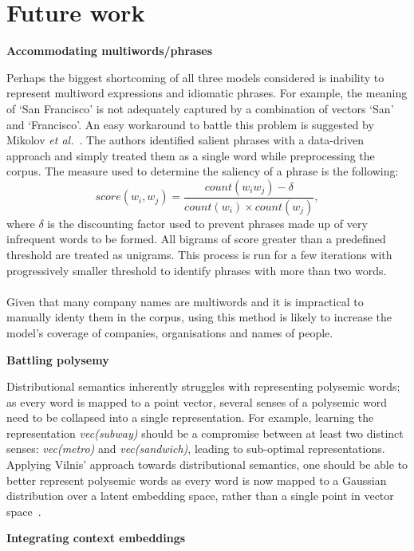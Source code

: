\documentclass[a4paper,12pt,twoside,openright]{report}
\newcommand{\tb}{\vspace{10pt} \textbf}
\newcommand{\ti}{\textit}
\begin{document}
\section{Future work}

\tb{Accommodating multiwords/phrases}

Perhaps the biggest shortcoming of all three models considered is inability to represent multiword expressions and idiomatic phrases. For example, the meaning of `San Francisco' is not adequately captured by a combination of vectors `San' and `Francisco'. An easy workaround to battle this problem is suggested by Mikolov \ti{et al.}~\cite{mikolov13c}. The authors identified salient phrases with a data-driven approach and simply treated them as a single word while preprocessing the corpus. The measure used to determine the saliency of a phrase is the following:
$$score(w_i, w_j) = \frac{count(w_i w_j) - \delta}{count(w_i) \times count(w_j)},$$
where $\delta$ is the discounting factor used to prevent phrases made up of very infrequent words to be formed. All bigrams of score greater than a predefined threshold are treated as unigrams. This process is run for a few iterations with progressively smaller threshold to identify phrases with more than two words. 
\\ \\
Given that many company names are multiwords and it is impractical to manually identy them in the corpus, using this method is likely to increase the model's coverage of companies, organisations and names of people.

\tb{Battling polysemy}

Distributional semantics inherently struggles with representing polysemic words; as every word is mapped to a point vector, several senses of a polysemic word need to be collapsed into a single representation. For example, learning the representation \ti{vec(subway)} should be a compromise between at least two distinct senses: \ti{vec(metro)} and \ti{vec(sandwich)}, leading to sub-optimal representations. Applying Vilnis' approach towards distributional semantics, one should be able to better represent polysemic words as every word is now mapped to a Gaussian distribution over a latent embedding space, rather than a single point in vector space~\cite{vilnis14}.

\tb{Integrating context embeddings}
\end{document}
